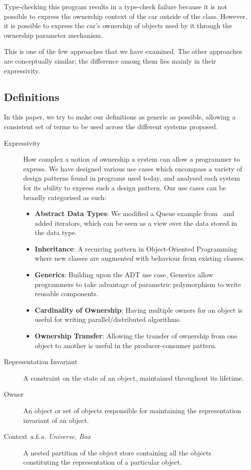 \documentclass{acm_proc_article-sp}
\begin{document}
Type-checking this program results in a type-check failure because it is not
possible to express the ownership context of the car outside of the class.
However, it is possible to express the car's ownership of objects used by it
through the ownership parameter mechanism.

This is one of the few approaches that we have examined. The other approaches
are conceptually similar; the difference among them lies mainly in their
expressivity.

\subsection{Definitions}
\label{subsec:definitions}

In this paper, we try to make our definitions as generic as possible, allowing
a consistent set of terms to be used across the different systems proposed.

\begin{description}
	\item[Expressivity] How complex a notion of ownership a system can allow a
		programmer to express. We have designed various use cases which
		encompass a variety of design patterns found in programs used today, and
		analysed each system for its ability to express such a design pattern.
		Our use cases can be broadly categorised as such:

	\begin{itemize}
		\item \textbf{Abstract Data Types}: We modified a Queue example
			from~\cite{boyapati04safejava} and added iterators, which can be
			seen as a view over the data stored in the data type.
		\item \textbf{Inheritance}: A recurring pattern in Object-Oriented
			Programming where new classes are augmented with behaviour from
			existing classes.
		\item \textbf{Generics}: Building upon the ADT use case, Generics
			allow programmers to take advantage of parametric polymorphism to
			write reusable components.
		\item \textbf{Cardinality of Ownership}: Having multiple owners for an
			object is useful for writing parallel/distributed algorithms.
		\item \textbf{Ownership Transfer}: Allowing the transfer of ownership
			from one object to another is useful in the \linebreak
			producer-consumer pattern.
	\end{itemize}

	\item[Representation Invariant] A constraint on the state of an object,
		maintained throughout its lifetime.
	\item[Owner] An object or set of objects responsible for maintaining the
		representation invariant of an object.
	\item[Context \emph{a.k.a. Universe, Box}] A nested partition of the object
		store containing all the objects constituting the representation of
		a particular object.
\end{description}
\end{document}
